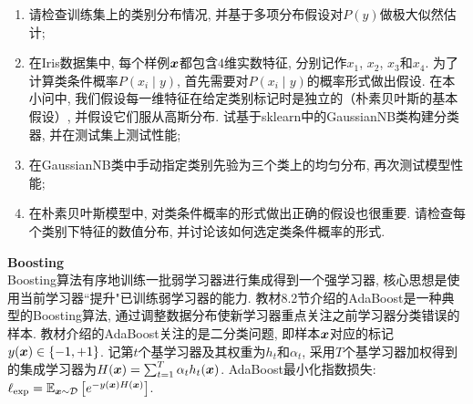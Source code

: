 \documentclass[answers]{exam}  %
\begin{document}
\begin{questions}
\begin{enumerate}
    \item 请检查训练集上的类别分布情况, 并基于多项分布假设对$P(y)$做极大似然估计;
    \item 在Iris数据集中, 每个样例${\boldsymbol{x}}$都包含$4$维实数特征, 分别记作$x_1$, $x_2$, $x_3$和$x_4$. 为了计算类条件概率$P(x_i\mid y)$, 首先需要对$P(x_i\mid y)$的概率形式做出假设. 在本小问中, 我们假设每一维特征在给定类别标记时是独立的（朴素贝叶斯的基本假设）, 并假设它们服从高斯分布. 试基于sklearn中的GaussianNB类构建分类器, 并在测试集上测试性能;
    \item 在GaussianNB类中手动指定类别先验为三个类上的均匀分布, 再次测试模型性能;
    \item 在朴素贝叶斯模型中, 对类条件概率的形式做出正确的假设也很重要. 请检查每个类别下特征的数值分布, 并讨论该如何选定类条件概率的形式.
\end{enumerate}

\begin{solution}
\end{solution}
\question [20] \textbf{Boosting} \\
Boosting算法有序地训练一批弱学习器进行集成得到一个强学习器, 核心思想是使用当前学习器``提升"已训练弱学习器的能力. 教材8.2节介绍的AdaBoost是一种典型的Boosting算法, 通过调整数据分布使新学习器重点关注之前学习器分类错误的样本. 教材介绍的AdaBoost关注的是二分类问题, 即样本${\boldsymbol{x}}$对应的标记$y({\boldsymbol{x}})\in \{-1, +1\}$. 记第$t$个基学习器及其权重为$h_t$和$\alpha_t$, 采用$T$个基学习器加权得到的集成学习器为$H({\boldsymbol{x}})=\sum_{t=1}^T \alpha_t h_t({\boldsymbol{x}})$. AdaBoost最小化指数损失: $\ell_{\text{exp}}=\mathbb{E}_{{\boldsymbol{x}} \sim \mathcal{D}}\left[ e^{-y({\boldsymbol{x}})H({\boldsymbol{x}})} \right]$. 




\end{questions}
\end{document}
